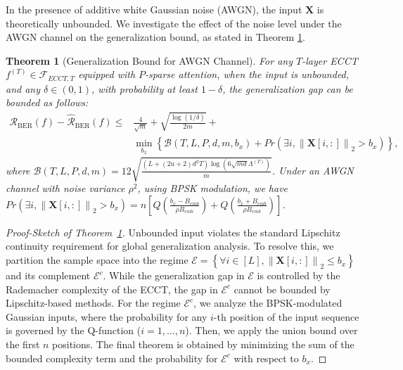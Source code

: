 \documentclass[lettersize,onecolumn]{IEEEtran}
\newtheorem{theorem}{Theorem}
\begin{document}
In the presence of additive white Gaussian noise (AWGN), the input $\mathbf{X}$ is theoretically unbounded. We investigate the effect of the noise level under the AWGN channel on the generalization bound, as stated in Theorem \ref{theorem: bound for AWGN}.

\begin{theorem}[Generalization Bound for AWGN Channel]\label{theorem: bound for AWGN}
     For any $T$-layer ECCT $f^{(T)} \in \mathcal{F}_{ECCT,T}$ equipped with $P$-sparse attention, when the input is unbounded, and any $\delta \in (0,1)$, with probability at least $1-\delta$, the generalization gap can be bounded as follows:
    \begin{equation}
        \begin{aligned}
        \mathcal{R}_{\mathrm{BER}}(f)-\hat{\mathcal{R}}_{\mathrm{BER}}(f) \leq &\frac{4}{\sqrt{m}}+\sqrt{\frac{\log (1 / \delta)}{2 m}}+ \\
        &\min_{b_x} \left\{\mathcal{B}(T, L, P, d, m, b_x) + Pr(\exists i, \left\|\mathbf{X}[i,:]\right\|_2>b_x)\right\},
        \end{aligned}
    \end{equation}
    where $\mathcal{B}(T, L, P, d, m) =  12 \sqrt{\frac{(L+(2 u+2) d^{2} T) \log (6 \sqrt{m d}\Lambda^{(T)}) }{m}}$. Under an AWGN channel with noise variance $\rho^2$, using BPSK modulation, we have $Pr(\exists i, \left\|\mathbf{X}[i,:]\right\|_2>b_x) = n \left[Q\left(\frac{b_{x}-B_{e m b}}{\rho B_{e m b}}\right)+Q\left(\frac{b_{x}+B_{e m b}}{\rho B_{e m b}}\right)\right]$.
\end{theorem}

\begin{proof}[Proof-Sketch of Theorem~\ref{theorem: bound for AWGN}]
    Unbounded input violates the standard Lipschitz continuity requirement for global generalization analysis. To resolve this, we partition the sample space into the regime $\mathcal{E}=\left\{\forall i \in[L],\left\|\mathbf{X}[i,:]\right\|_{2} \leq b_{x}\right\}$ and its complement $\mathcal{E}^c$. While the generalization gap in $\mathcal{E}$ is controlled by the Rademacher complexity of the ECCT, the gap in $\mathcal{E}^c$ cannot be bounded by Lipschitz-based methods. For the regime $\mathcal{E}^c$, we analyze the BPSK-modulated Gaussian inputs, where the probability for any $i$-th position of the input sequence is governed by the Q-function ($i=1,\ldots,n$). Then, we apply the union bound over the first $n$ positions. The final theorem is obtained by minimizing the sum of the bounded complexity term and the probability for $\mathcal{E}^c$ with respect to $b_x$.
\end{proof}
\end{document}
